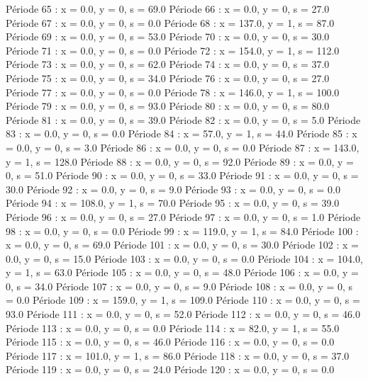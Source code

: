 Période 65 : x = 0.0, y = 0, s = 69.0
Période 66 : x = 0.0, y = 0, s = 27.0
Période 67 : x = 0.0, y = 0, s = 0.0
Période 68 : x = 137.0, y = 1, s = 87.0
Période 69 : x = 0.0, y = 0, s = 53.0
Période 70 : x = 0.0, y = 0, s = 30.0
Période 71 : x = 0.0, y = 0, s = 0.0
Période 72 : x = 154.0, y = 1, s = 112.0
Période 73 : x = 0.0, y = 0, s = 62.0
Période 74 : x = 0.0, y = 0, s = 37.0
Période 75 : x = 0.0, y = 0, s = 34.0
Période 76 : x = 0.0, y = 0, s = 27.0
Période 77 : x = 0.0, y = 0, s = 0.0
Période 78 : x = 146.0, y = 1, s = 100.0
Période 79 : x = 0.0, y = 0, s = 93.0
Période 80 : x = 0.0, y = 0, s = 80.0
Période 81 : x = 0.0, y = 0, s = 39.0
Période 82 : x = 0.0, y = 0, s = 5.0
Période 83 : x = 0.0, y = 0, s = 0.0
Période 84 : x = 57.0, y = 1, s = 44.0
Période 85 : x = 0.0, y = 0, s = 3.0
Période 86 : x = 0.0, y = 0, s = 0.0
Période 87 : x = 143.0, y = 1, s = 128.0
Période 88 : x = 0.0, y = 0, s = 92.0
Période 89 : x = 0.0, y = 0, s = 51.0
Période 90 : x = 0.0, y = 0, s = 33.0
Période 91 : x = 0.0, y = 0, s = 30.0
Période 92 : x = 0.0, y = 0, s = 9.0
Période 93 : x = 0.0, y = 0, s = 0.0
Période 94 : x = 108.0, y = 1, s = 70.0
Période 95 : x = 0.0, y = 0, s = 39.0
Période 96 : x = 0.0, y = 0, s = 27.0
Période 97 : x = 0.0, y = 0, s = 1.0
Période 98 : x = 0.0, y = 0, s = 0.0
Période 99 : x = 119.0, y = 1, s = 84.0
Période 100 : x = 0.0, y = 0, s = 69.0
Période 101 : x = 0.0, y = 0, s = 30.0
Période 102 : x = 0.0, y = 0, s = 15.0
Période 103 : x = 0.0, y = 0, s = 0.0
Période 104 : x = 104.0, y = 1, s = 63.0
Période 105 : x = 0.0, y = 0, s = 48.0
Période 106 : x = 0.0, y = 0, s = 34.0
Période 107 : x = 0.0, y = 0, s = 9.0
Période 108 : x = 0.0, y = 0, s = 0.0
Période 109 : x = 159.0, y = 1, s = 109.0
Période 110 : x = 0.0, y = 0, s = 93.0
Période 111 : x = 0.0, y = 0, s = 52.0
Période 112 : x = 0.0, y = 0, s = 46.0
Période 113 : x = 0.0, y = 0, s = 0.0
Période 114 : x = 82.0, y = 1, s = 55.0
Période 115 : x = 0.0, y = 0, s = 46.0
Période 116 : x = 0.0, y = 0, s = 0.0
Période 117 : x = 101.0, y = 1, s = 86.0
Période 118 : x = 0.0, y = 0, s = 37.0
Période 119 : x = 0.0, y = 0, s = 24.0
Période 120 : x = 0.0, y = 0, s = 0.0

